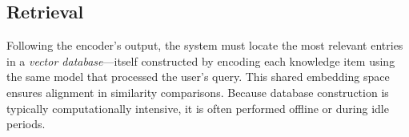 

\subsection{Retrieval}
\label{sec:BG:Retrieval}
Following the encoder’s output, the system must locate the most relevant entries in a \emph{vector database}---itself constructed by encoding each knowledge item using the same model that processed the user’s query. 
This shared embedding space ensures alignment in similarity comparisons. Because database construction is typically computationally intensive, it is often performed offline or during idle periods.

